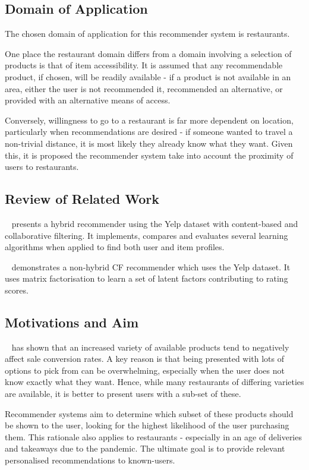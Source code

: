 \subsection{Domain of Application}\label{subsec:domain-of-application}
The chosen domain of application for this recommender system is restaurants.

One place the restaurant domain differs from a domain involving a selection of products is that of item accessibility.
It is assumed that any recommendable product, if chosen, will be readily available - if a product is not available in an area, either the user is not recommended it, recommended an alternative, or provided with an alternative means of access.

Conversely, willingness to go to a restaurant is far more dependent on location, particularly when recommendations are desired - if someone wanted to travel a non-trivial distance, it is most likely they already know what they want.
Given this, it is proposed the recommender system take into account the proximity of users to restaurants.

\subsection{Review of Related Work}\label{subsec:related-work-review}
~\cite{sawant2013yelp} presents a hybrid recommender using the Yelp dataset with content-based and collaborative filtering.
It implements, compares and evaluates several learning algorithms when applied to find both user and item profiles.

~\cite{mcdpk2016} demonstrates a non-hybrid CF recommender which uses the Yelp dataset.
It uses matrix factorisation to learn a set of latent factors contributing to rating scores.

\subsection{Motivations and Aim}\label{subsec:aim}
~\cite{chernev2015choice} has shown that an increased variety of available products tend to negatively affect sale conversion rates.
A key reason is that being presented with lots of options to pick from can be overwhelming, especially when the user does not know exactly what they want.
Hence, while many restaurants of differing varieties are available, it is better to present users with a sub-set of these.

Recommender systems aim to determine which subset of these products should be shown to the user, looking for the highest likelihood of the user purchasing them.
This rationale also applies to restaurants - especially in an age of deliveries and takeaways due to the pandemic.
The ultimate goal is to provide relevant personalised recommendations to known-users.
